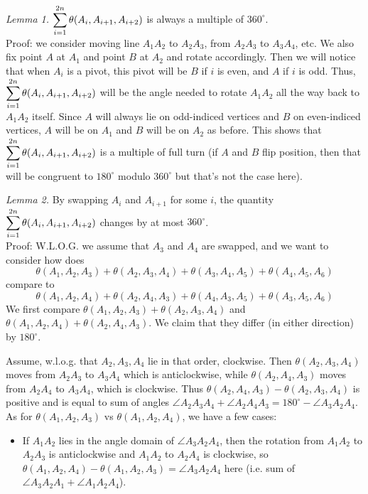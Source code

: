 \documentclass[11pt,a4paper]{article}
\begin{document}
\begin{enumerate}
	\emph{Lemma 1.} $\displaystyle\sum_{i=1}^{2n}\theta(A_i, A_{i+1}, A_{i+2})$ is always a multiple of $360^{\circ}$. \\
	Proof: we consider moving line $A_1A_2$ to $A_2A_3$, from $A_2A_3$ to $A_3A_4$, etc. 
	We also fix point $A$ at $A_1$ and point $B$ at $A_2$ and rotate accordingly. Then we will notice that when $A_i$ is a pivot, this pivot will be $B$ if $i$ is even, and $A$ if $i$ is odd. Thus, $\displaystyle\sum_{i=1}^{2n}\theta(A_i, A_{i+1}, A_{i+2})$ will be the angle needed to rotate $A_1A_2$ all the way back to $A_1A_2$ itself. Since $A$ will always lie on odd-indiced vertices and $B$ on even-indiced vertices, $A$ will be on $A_1$ and $B$ will be on $A_2$ as before. This shows that $\displaystyle\sum_{i=1}^{2n}\theta(A_i, A_{i+1}, A_{i+2})$ is a multiple of full turn (if $A$ and $B$ flip position, then that will be congruent to $180^{\circ}$ modulo $360^{\circ}$ but that's not the case here). 
	
	\emph{Lemma 2.} By swapping $A_i$ and $A_{i+1}$ for some $i$, the quantity $\displaystyle\sum_{i=1}^{2n}\theta(A_i, A_{i+1}, A_{i+2})$ changes by at most $360^{\circ}$. \\
	Proof: W.L.O.G. we assume that $A_3$ and $A_4$ are swapped, and we want to consider how does 
	\[
	\theta(A_1, A_2, A_3)+\theta(A_2, A_3, A_4)+\theta(A_3, A_4, A_5) + \theta (A_4, A_5, A_6)
	\]
	compare to 
	\[
	\theta(A_1, A_2, A_4)+\theta(A_2, A_4, A_3)+\theta(A_4, A_3, A_5) + \theta (A_3, A_5, A_6)
	\]
	We first compare $\theta(A_1, A_2, A_3)+\theta(A_2, A_3, A_4)$ and $\theta(A_1, A_2, A_4)+\theta(A_2, A_4, A_3)$. We claim that they differ (in either direction) by $180^{\circ}$. 
	
	Assume, w.l.o.g. that $A_2, A_3, A_4$ lie in that order, clockwise. Then $\theta(A_2, A_3, A_4)$ moves from $A_2A_3$ to $A_3A_4$ which is anticlockwise, while $\theta(A_2, A_4, A_3)$ moves from $A_2A_4$ to $A_3A_4$, which is clockwise. Thus $\theta(A_2, A_4, A_3)-\theta(A_2, A_3, A_4)$ is positive and is equal to sum of angles $\angle A_2A_3A_4+\angle A_2A_4A_3=180^{\circ} - \angle A_3A_2A_4$. 
	As for $\theta(A_1, A_2, A_3)$ vs $\theta(A_1, A_2, A_4)$, we have a few cases: 
	\begin{itemize}
		\item If $A_1A_2$ lies in the angle domain of $\angle A_3A_2A_4$, then the rotation from $A_1A_2$ to $A_2A_3$ is anticlockwise and $A_1A_2$ to $A_2A_4$ is clockwise, so $\theta(A_1, A_2, A_4)-\theta(A_1, A_2, A_3)=\angle A_3A_2A_4$ here (i.e. sum of $\angle A_3A_2A_1+\angle A_1A_2A_4$). 
		

\end{itemize}
\end{enumerate}
\end{document}
